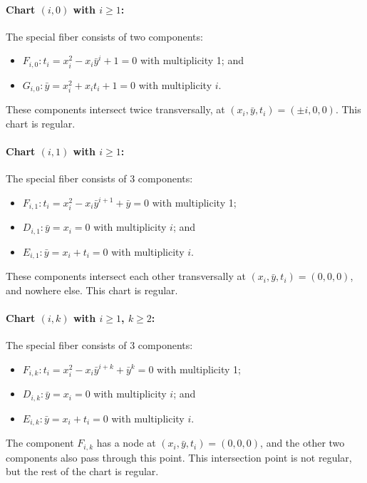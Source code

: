 \documentclass[reqno]{amsart}
\theoremstyle{definition}
\theoremstyle{remark}
\newcommand{\sy}{\bar{y}}
\begin{document}
\paragraph{Chart $(i, 0)$ with $i \geq 1$:}
\label{sec:case-k=0}

The special fiber consists of two components:
\begin{itemize}
    \item $F_{i,0}: t_i = x_i^2 - x_i\sy^i + 1 = 0$ with multiplicity 1; and
    \item $G_{i,0}: \sy = x_i^2 + x_it_i + 1 = 0$ with multiplicity $i$.
\end{itemize}
These components intersect twice transversally, at $(x_i, \sy, t_i) = (\pm i, 0, 0)$. This chart is regular.



\paragraph{Chart $(i, 1)$ with $i \geq 1$:}
\label{sec:case-i-1}

The special fiber consists of 3 components:
\begin{itemize}
    \item $F_{i,1}: t_i = x_i^2 - x_i\sy^{i+1} + \sy = 0$ with multiplicity 1;
    \item $D_{i,1}: \sy = x_i = 0$ with multiplicity $i$; and
    \item $E_{i,1}: \sy = x_i + t_i = 0$ with multiplicity $i$.
\end{itemize}
These components intersect each other transversally at $(x_i, \sy, t_i) = (0,0,0)$, and nowhere else. This chart is regular.



\paragraph{Chart $(i, k)$ with $i\geq 1$, $k\geq 2$:}
\label{sec:higher-i-k}

The special fiber consists of 3 components:
\begin{itemize}
    \item $F_{i,k}: t_i = x_i^2 - x_i\sy^{i+k} + \sy^k = 0$ with multiplicity 1;
    \item $D_{i,k}: \sy = x_i = 0$ with multiplicity $i$; and
    \item $E_{i,k}: \sy = x_i + t_i = 0$ with multiplicity $i$.
\end{itemize}
The component $F_{i,k}$ has a node at $(x_i,\sy,t_i) = (0,0,0)$, and the other two components also pass through this point. This intersection point is not regular, but the rest of the chart is regular.
\end{document}
